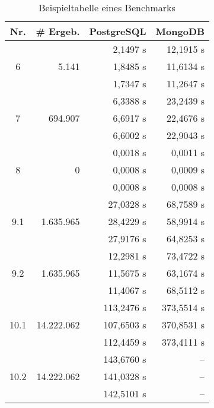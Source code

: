 \begin{table}[hb]
\begin{minipage}{0.49\linewidth}
\end{minipage}
%
\begin{minipage}{0.49\linewidth}
\centering
\begin{tabular}{|c | r | r | r ||} 
    \hline
    \textbf{Nr.} & \textbf{\# Ergeb.} & \textbf{PostgreSQL} & \textbf{MongoDB} \\ [0.5ex] 
    \hline\hline 
    \multirow{3}{*}{6} & \multirow{3}{*}{5.141}
      & 2,1497 s & 12,1915 s \\
    & & 1,8485 s & 11,6134 s \\
    & & 1,7347 s & 11,2647 s \\
    \hline
    \multirow{3}{*}{7} & \multirow{3}{*}{694.907} 
      & 6,3388 s & 23,2439 s \\
    & & 6,6917 s & 22,4676 s \\
    & & 6,6002 s & 22,9043 s \\
    \hline
    \multirow{3}{*}{8} & \multirow{3}{*}{0} 
      & 0,0018 s & 0,0011 s \\
    & & 0,0008 s & 0,0009 s \\
    & & 0,0008 s & 0,0008 s \\
    \hline
    \multirow{3}{*}{9.1} & \multirow{3}{*}{1.635.965} 
      & 27,0328 s & 68,7589 s \\
    & & 28,4229 s & 58,9914 s \\
    & & 27,9176 s & 64,8253 s \\
    \hline
    \multirow{3}{*}{9.2} & \multirow{3}{*}{1.635.965} 
      & 12,2981 s & 73,4722 s \\
    & & 11,5675 s & 63,1674 s \\
    & & 11,4067 s & 68,5112 s \\
    \hline
    \multirow{3}{*}{10.1} & \multirow{3}{*}{14.222.062} 
      & 113,2476 s & 373,5514 s \\
    & & 107,6503 s & 370,8531 s \\
    & & 112,4459 s & 373,4111 s \\
    \hline
    \multirow{3}{*}{10.2} & \multirow{3}{*}{14.222.062} 
      & 143,6760 s & -- \\
    & & 141,0328 s & -- \\
    & & 142,5101 s & -- \\
    \hline
\end{tabular}
\end{minipage}
\caption{Beispieltabelle eines Benchmarks}
\label{tab:benchmark_results}
\end{table}
